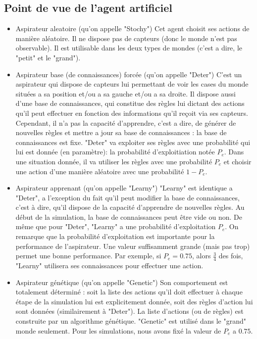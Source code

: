 \documentclass[12pt]{article}
\begin{document}
\subsection{Point de vue de l'agent artificiel}
\justify
\begin{itemize}
\item Aspirateur aleatoire (qu'on appelle "Stochy")
Cet agent choisit ses actions de manière aléatoire. Il ne dispose pas de capteurs (donc le monde n'est pas observable). Il est utilisable dans les deux types de mondes (c'est a dire, le "petit" et le "grand").   
\item Aspirateur base (de connaissances) forcée (qu'on appelle "Deter")
C'est un aspirateur qui dispose de capteurs lui permettant de voir les cases du monde situées a sa position et/ou a sa gauche et/ou a sa droite. Il dispose aussi d'une base de connaissances, qui constitue des règles lui dictant des actions qu'il peut effectuer en fonction des informations qu'il reçoit via ses capteurs. Cependant, il n'a pas la capacité d'apprendre, c'est a dire, de générer de nouvelles règles et mettre a jour sa base de connaissances : la base de connaissances est fixe. "Deter" va exploiter ses règles avec une probabilité qui lui est donnée (en paramètre): la probabilité d'exploitiation notée $P_e$. Dans une situation donnée, il va utiliser les règles avec une probabilité $P_e$ et choisir une action d'une manière aléatoire avec une probabilité $1-P_e$. 
\item Aspirateur apprenant (qu'on appelle "Learny")
"Learny" est identique a "Deter", a l'exception du fait qu'il peut modifier la base de connaissances, c'est à dire, qu'il dispose de la capacité d'apprendre de nouvelles règles. Au début de la simulation, la base de connaissances peut être vide ou non. De même que pour "Deter", "Learny" a une probabilité d'exploitation $P_e$. On remarque que la probabilité d'exploitation est importante pour la performance de l'aspirateur. Une valeur suffisamment grande (mais pas trop) permet une bonne performance. Par exemple, si $P_e = 0.75$, alors $\frac{3}{4}$ des fois, "Learny" utilisera ses connaissances pour effectuer une action.
\item Aspirateur génétique (qu'on appelle "Genetic")
Son comportement est totalement déterminé : soit la liste des actions qu'il doit effectuer à chaque étape de la simulation lui est explicitement donnée, soit des règles d'action lui sont données (similairement à "Deter"). La liste d'actions (ou de règles) est construite par un algorithme génétique. "Genetic" est utilisé dans le "grand" monde seulement. Pour les simulations, nous avons fix\'e la valeur de $P_e$ a $0.75$. 
\end{itemize}
\end{document}

